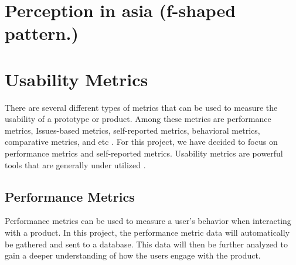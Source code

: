 \section{Perception in asia (f-shaped pattern.)}

\section{Usability Metrics}
There are several different types of metrics that can be used to measure the usability of a prototype or product. Among these metrics are performance metrics, Issues-based metrics, self-reported metrics, behavioral metrics, comparative metrics, and etc \cite{tullis_albert_2011}. For this project, we have decided to focus on performance metrics and self-reported metrics. Usability metrics are powerful tools that are generally under utilized \cite{norman_metrics}. 

\subsection{Performance Metrics}
Performance metrics can be used to measure a user's behavior when interacting with a product. In this project, the performance metric data will automatically be gathered and sent to a database. This data will then be further analyzed to gain a deeper understanding of how the users engage with the product. 

